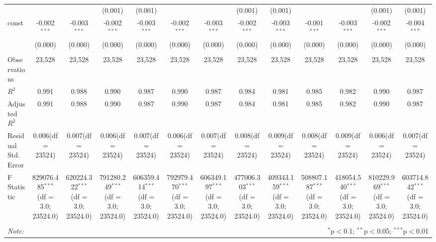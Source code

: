 \begin{table}[!htbp]
\begin{tabular}{@{\extracolsep{5pt}}lcccccccccccc}
  & & & (0.001) & (0.001) & & & (0.001) & (0.001) & & & (0.001) & (0.001) \\
 const & -0.002$^{***}$ & -0.003$^{***}$ & -0.002$^{***}$ & -0.003$^{***}$ & -0.002$^{***}$ & -0.003$^{***}$ & -0.002$^{***}$ & -0.003$^{***}$ & -0.001$^{***}$ & -0.003$^{***}$ & -0.002$^{***}$ & -0.004$^{***}$ \\
  & (0.000) & (0.000) & (0.000) & (0.000) & (0.000) & (0.000) & (0.000) & (0.000) & (0.000) & (0.000) & (0.000) & (0.000) \\
\hline \\[-1.8ex]
 Observations & 23,528 & 23,528 & 23,528 & 23,528 & 23,528 & 23,528 & 23,528 & 23,528 & 23,528 & 23,528 & 23,528 & 23,528 \\
 $R^2$ & 0.991 & 0.988 & 0.990 & 0.987 & 0.990 & 0.987 & 0.984 & 0.981 & 0.985 & 0.982 & 0.990 & 0.987 \\
 Adjusted $R^2$ & 0.991 & 0.988 & 0.990 & 0.987 & 0.990 & 0.987 & 0.984 & 0.981 & 0.985 & 0.982 & 0.990 & 0.987 \\
 Residual Std. Error & 0.006(df = 23524) & 0.007(df = 23524) & 0.006(df = 23524) & 0.007(df = 23524) & 0.006(df = 23524) & 0.007(df = 23524) & 0.008(df = 23524) & 0.009(df = 23524) & 0.008(df = 23524) & 0.009(df = 23524) & 0.006(df = 23524) & 0.007(df = 23524)  \\
 F Statistic & 829076.485$^{***}$ (df = 3.0; 23524.0) & 620224.322$^{***}$ (df = 3.0; 23524.0) & 791280.249$^{***}$ (df = 3.0; 23524.0) & 606359.414$^{***}$ (df = 3.0; 23524.0) & 792979.470$^{***}$ (df = 3.0; 23524.0) & 606349.197$^{***}$ (df = 3.0; 23524.0) & 477006.303$^{***}$ (df = 3.0; 23524.0) & 409343.159$^{***}$ (df = 3.0; 23524.0) & 508807.187$^{***}$ (df = 3.0; 23524.0) & 418054.540$^{***}$ (df = 3.0; 23524.0) & 810229.969$^{***}$ (df = 3.0; 23524.0) & 603714.842$^{***}$ (df = 3.0; 23524.0) \\
\hline
\hline \\[-1.8ex]
\textit{Note:} & \multicolumn{12}{r}{$^{*}$p$<$0.1; $^{**}$p$<$0.05; $^{***}$p$<$0.01} \\
\end{tabular}
\end{table}